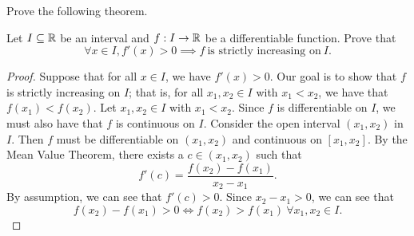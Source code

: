 \documentclass[a4paper]{article}
\begin{document}
\begin{problem}
    Prove the following theorem.
\end{problem}
\begin{theorem}[ ]
   Let \( I \subseteq  \mathbb{R}   \) be an interval and \( f: I \to \mathbb{R}  \) be a differentiable function. Prove that 
   \[  \forall x \in I, f'(x) > 0 \implies f \ \text{is strictly increasing on} \ I.  \]
\end{theorem}
\begin{proof}
    Suppose that for all \( x \in I  \), we have \( f'(x) > 0  \). Our goal is to show that \( f  \) is strictly increasing on \( I  \); that is, for all \( {x}_{1}, {x}_{2} \in I \) with \( {x}_{1} < {x}_{2} \), we have that \( f({x}_{1}) < f({x}_{2}) \). Let \( {x}_{1}, {x}_{2} \in I  \) with \( {x}_{1} < {x}_{2} \). Since \( f  \) is differentiable on \( I  \), we must also have that \( f  \) is continuous on \( I  \). Consider the open interval \( ({x}_{1}, {x}_{2}) \) in \( I  \). Then \( f  \) must be differentiable on \( ({x}_{1}, {x}_{2}) \) and continuous on \( [{x}_{1}, {x}_{2}] \). By the Mean Value Theorem, there exists a \( c \in ({x}_{1}, {x}_{2}) \) such that 
    \[  f'(c) = \frac{ f({x}_{2}) - f({x}_{1}) }{ {x}_{2} - {x}_{1} }. \]
    By assumption, we can see that \( f'(c) > 0  \). Since \( {x}_{2} - {x}_{1} > 0  \), we can see that
    \[  f({x}_{2}) - f({x}_{1}) > 0 \iff f({x}_{2}) > f({x}_{1}) \ \forall {x}_{1}, {x}_{2} \in I.  \]
    
\end{proof}
\end{document}
